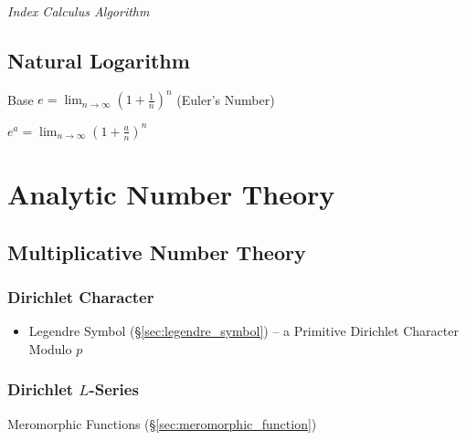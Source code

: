 \emph{Index Calculus Algorithm}



\subsection{Natural Logarithm}\label{sec:natural_logarithm}

Base $e = \lim_{n \rightarrow \infty} (1 + \frac{1}{n})^n$
(Euler's Number)

$e^a = \lim_{n \rightarrow \infty} (1 + \frac{a}{n})^n$



\section{Analytic Number Theory}\label{sec:analytic_number_theory}

\subsection{Multiplicative Number Theory}
\label{sec:multiplicative_number_theory}

\subsubsection{Dirichlet Character}\label{sec:dirichlet_character}

\begin{itemize}
  \item Legendre Symbol (\S\ref{sec:legendre_symbol}) -- a Primitive Dirichlet
    Character Modulo $p$
\end{itemize}



\subsubsection{Dirichlet $L$-Series}\label{sec:l_series}

Meromorphic Functions (\S\ref{sec:meromorphic_function})



